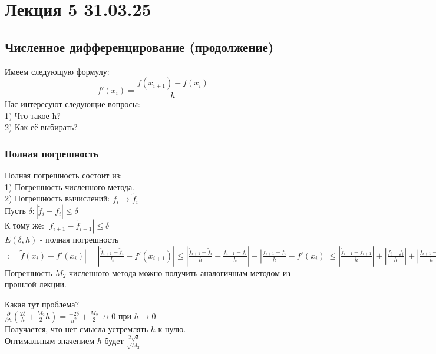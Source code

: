 \section{Лекция 5 31.03.25}

\subsection{Численное дифференцирование (продолжение)}

Имеем следующую формулу:
\begin{equation}
 f'(x_i) = \frac{f(x_{i+1}) - f(x_{i})}{h}
\end{equation}
Нас интересуют следующие вопросы:\\
1) Что такое h?\\
2) Как её выбирать?

\subsubsection{Полная погрешность}
Полная погрешность состоит из:\\
1) Погрешность численного метода.\\
2) Погрешность вычислений: $f_{i}\to \tilde{f}_i $ \\

Пусть $\delta: |\tilde{f}_i-f_i| \leq \delta $ \\
К тому же: $|f_{i+1}-\tilde{f}_{i+1}| \leq \delta $ \\

$E(\delta,h)$ - полная погрешность $:= |\tilde{f}(x_{i})-f'(x_{i})|=|\frac{\tilde{f}_{i+1} - \tilde{f}_{i}}{h} -f'(x_{i+1})| \leq |\frac{\tilde{f}_{i+1} - \tilde{f}_{i}}{h} - \frac{f_{i+1} - f_{i}}{h}| + |\frac{f_{i+1} - f_{i}}{h} -f'(x_{i})|  \leq  |\frac{\tilde{f}_{i+1} - f_{i+1}}{h}| + |\frac{\tilde{f}_{i} - f_{i}}{h}| + |\frac{f_{i+1} - f_{i}}{h} -f'(x_{i})|  \leq \frac{2\delta}{h} + \frac{M_2}{2}h $ \\
Погрешность $M_2$ численного метода можно получить аналогичным методом из прошлой лекции.


Какая тут проблема?\\
$\frac{\partial}{\partial h}(\frac{2\delta}{h} + \frac{M_2}{2}h) = \frac{-2\delta}{h^2} + \frac{M_2}{2}  \nrightarrow 0$ при $h \to 0$\\
Получается, что нет смысла устремлять $h$ к нулю.\\
Оптимальным значением $h$ будет $\frac{2\sqrt{\delta}}{\sqrt{M_2}}$\\


